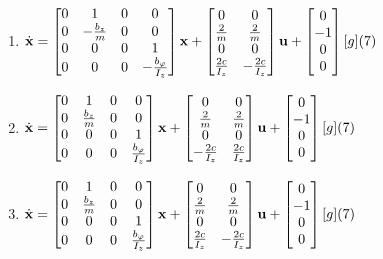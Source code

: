 \documentclass{article}
\begin{document}
\begin{enumerate}[resume]
\begin{enumerate}[label=\alph*.]
    \item $\dot{\mathbf{x}} = \begin{bmatrix} 0 & 1 & 0 & 0 \\ 0 & -\frac{b_z}{m} & 0 & 0 \\ 0 & 0 & 0 & 1 \\ 0 & 0 & 0 & -\frac{b_{\varphi}}{I_z} \end{bmatrix} \mathbf{x} + \begin{bmatrix} 0 & 0 \\ \frac{2}{m} & \frac{2}{m} \\ 0 & 0 \\ \frac{2c}{I_z} & -\frac{2c}{I_z} \end{bmatrix} \mathbf{u} + \begin{bmatrix} 0 \\ -1 \\ 0 \\ 0 \end{bmatrix} [g] \hfill (7)$
    \vspace{2mm}

    \item $\dot{\mathbf{x}} = \begin{bmatrix} 0 & 1 & 0 & 0 \\ 0 & \frac{b_z}{m} & 0 & 0 \\ 0 & 0 & 0 & 1 \\ 0 & 0 & 0 & \frac{b_{\varphi}}{I_z} \end{bmatrix} \mathbf{x} + \begin{bmatrix} 0 & 0 \\ \frac{2}{m} & \frac{2}{m} \\ 0 & 0 \\ -\frac{2c}{I_z} & \frac{2c}{I_z} \end{bmatrix} \mathbf{u} + \begin{bmatrix} 0 \\ -1 \\ 0 \\ 0 \end{bmatrix} [g] \hfill (7)$
    \vspace{2mm}

    \item $\dot{\mathbf{x}} = \begin{bmatrix} 0 & 1 & 0 & 0 \\ 0 & \frac{b_z}{m} & 0 & 0 \\ 0 & 0 & 0 & 1 \\ 0 & 0 & 0 & \frac{b_{\varphi}}{I_z} \end{bmatrix} \mathbf{x} + \begin{bmatrix} 0 & 0 \\ \frac{2}{m} & \frac{2}{m} \\ 0 & 0 \\ \frac{2c}{I_z} & -\frac{2c}{I_z} \end{bmatrix} \mathbf{u} + \begin{bmatrix} 0 \\ -1 \\ 0 \\ 0 \end{bmatrix} [g] \hfill (7)$
    \vspace{2mm}


\end{enumerate}
\end{enumerate}
\end{document}
